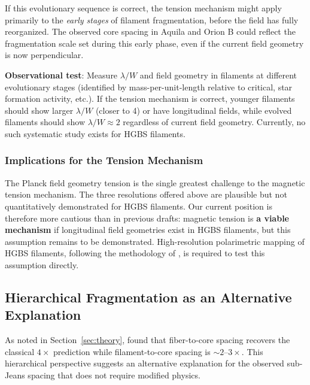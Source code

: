 \documentclass[11pt,a4paper]{article}
\begin{document}
If this evolutionary sequence is correct, the tension mechanism might apply primarily to the \emph{early stages} of filament fragmentation, before the field has fully reorganized. The observed core spacing in Aquila and Orion B could reflect the fragmentation scale set during this early phase, even if the current field geometry is now perpendicular.

\textbf{Observational test}: Measure $\lambda/W$ and field geometry in filaments at different evolutionary stages (identified by mass-per-unit-length relative to critical, star formation activity, etc.). If the tension mechanism is correct, younger filaments should show larger $\lambda/W$ (closer to 4) or have longitudinal fields, while evolved filaments should show $\lambda/W \approx 2$ regardless of current field geometry. Currently, no such systematic study exists for HGBS filaments.

\subsubsection{Implications for the Tension Mechanism}

The Planck field geometry tension is the single greatest challenge to the magnetic tension mechanism. The three resolutions offered above are plausible but not quantitatively demonstrated for HGBS filaments. Our current position is therefore more cautious than in previous drafts: magnetic tension is \textbf{a viable mechanism} if longitudinal field geometries exist in HGBS filaments, but this assumption remains to be demonstrated. High-resolution polarimetric mapping of HGBS filaments, following the methodology of \citet{Jadhav2026}, is required to test this assumption directly.

\subsection{Hierarchical Fragmentation as an Alternative Explanation}

As noted in Section~\ref{sec:theory}, \citet{Yang2024} found that fiber-to-core spacing recovers the classical $4\times$ prediction while filament-to-core spacing is $\sim2$--$3\times$. This hierarchical perspective suggests an alternative explanation for the observed sub-Jeans spacing that does not require modified physics.
\end{document}
